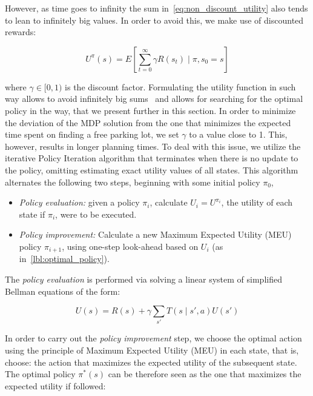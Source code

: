 However, as time goes to infinity the sum in~\eqref{eq:non_discount_utility}
also tends to lean to infinitely big values. In order to avoid this, we make
use of discounted rewards:

\begin{equation}
\label{eq:discount_utility}
U^{\pi}(s) = E\left[\sum_{t=0}^{\infty} \gamma R(s_t) \mid \pi,s_0 = s \right]
\end{equation}

where $\gamma \in [0, 1)$ is the discount factor. Formulating the utility
function in such way allows to avoid infinitely big
sums~\cite{Russell:2003:AIM:773294} and allows for searching for the optimal
policy in the way, that we present further in this section. In order to
minimize the deviation of the MDP solution from the one that minimizes the
expected time spent on finding a free parking lot, we set $\gamma$ to a value
close to 1. This, however, results in longer planning times. To deal with this
issue, we utilize the iterative Policy Iteration algorithm that terminates
when there is no update to the policy, omitting estimating exact utility
values of all states. This algorithm alternates the following two steps,
beginning with some initial policy $\pi_0$,

\begin{itemize}
    \item \emph{Policy evaluation:} given a policy $\pi_i$,
    calculate $U_i = U^{\pi_i}$, the utility of each state if $\pi_i$, were to be
    executed.
    \item \emph{Policy improvement:} Calculate a new Maximum Expected Utility (MEU) policy $\pi_{i+1}$, using one-step look-ahead based on
    $U_i$ (as in~\eqref{lbl:optimal_policy}).
\end{itemize}

The \emph{policy evaluation} is performed via solving a linear system of simplified Bellman equations of the form:

\begin{equation}
\label{lbl:bellman_equation}
U(s) = R(s) + \gamma \sum_{s'}T(s \mid s', a)U(s')
\end{equation}

In order to carry out the \emph{policy improvement} step, we choose the
optimal action using the principle of Maximum Expected Utility (MEU) in each
state, that is, choose: the action that maximizes the expected utility of the
subsequent state. The optimal policy $\pi^*(s)$ can be therefore seen as the one that maximizes
the expected utility if followed:

